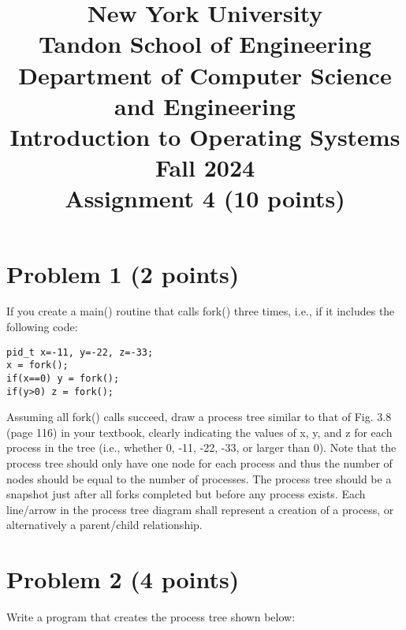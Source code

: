 \documentclass{article}
\begin{document}
\title{New York University \\ Tandon School of Engineering \\ Department of Computer Science and Engineering \\ Introduction to Operating Systems \\ Fall 2024 \\ Assignment 4 (10 points)}
\date{}
\maketitle

\section*{Problem 1 (2 points)}

If you create a main() routine that calls fork() three times, i.e., if it includes the following code:

\texttt{pid\_t x=-11, y=-22, z=-33;} \\
\texttt{x = fork();}\\
\texttt{if(x==0) y = fork();}\\
\texttt{if(y>0) z = fork(); }

Assuming all fork() calls succeed, draw a process tree similar to that of Fig. 3.8 (page 116) in your textbook, clearly indicating the values of x, y, and z for each process in the tree (i.e., whether 0, -11, -22, -33, or larger than 0).  Note that the process tree should only have one node for each process and thus the number of nodes should be equal to the number of processes. The process tree should be a snapshot just after all forks completed but before any process exists. Each line/arrow in the process tree diagram shall represent a creation of a process, or alternatively a parent/child relationship.



\section*{Problem 2 (4 points)}

Write a program that creates the process tree shown below:

\end{document}
